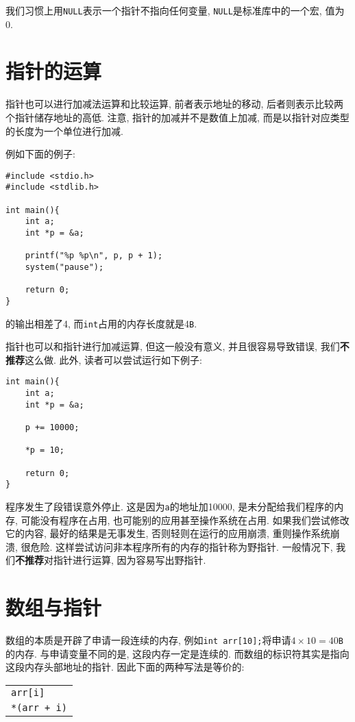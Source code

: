         我们习惯上用\texttt{NULL}表示一个指针不指向任何变量, \texttt{NULL}是标准库中的一个宏, 值为0.

    \section{指针的运算}
        指针也可以进行加减法运算和比较运算, 前者表示地址的移动, 后者则表示比较两个指针储存地址的高低. 注意, 指针的加减并不是数值上加减, 而是以指针对应类型的长度为一个单位进行加减.

        例如下面的例子:
\begin{lstlisting}
#include <stdio.h>
#include <stdlib.h>

int main(){
    int a;
    int *p = &a;

    printf("%p %p\n", p, p + 1);
    system("pause");

    return 0;
}
\end{lstlisting}
        的输出相差了4, 而\texttt{int}占用的内存长度就是4\texttt{B}.

        指针也可以和指针进行加减运算, 但这一般没有意义, 并且很容易导致错误, 我们\textbf{不推荐}这么做. 此外, 读者可以尝试运行如下例子:
\begin{lstlisting}
int main(){
    int a;
    int *p = &a;

    p += 10000;

    *p = 10;

    return 0;
}
\end{lstlisting}

        程序发生了段错误意外停止. 这是因为\texttt{a}的地址加10000, 是未分配给我们程序的内存, 可能没有程序在占用, 也可能别的应用甚至操作系统在占用. 如果我们尝试修改它的内容, 最好的结果是无事发生, 否则轻则在运行的应用崩溃, 重则操作系统崩溃, 很危险. 这样尝试访问非本程序所有的内存的指针称为野指针. 一般情况下, 我们\textbf{不推荐}对指针进行运算, 因为容易写出野指针.

    \section{数组与指针}
        数组的本质是开辟了申请一段连续的内存, 例如\texttt{int arr[10];}将申请$4\times 10=40$\texttt{B}的内存. 与申请变量不同的是, 这段内存一定是连续的. 而数组的标识符其实是指向这段内存头部地址的指针. 因此下面的两种写法是等价的:
        \begin{center}
        \begin{longtable}{l}
            \texttt{arr[i]} \\
            \texttt{*(arr + i)}
        \end{longtable}
        \end{center}

